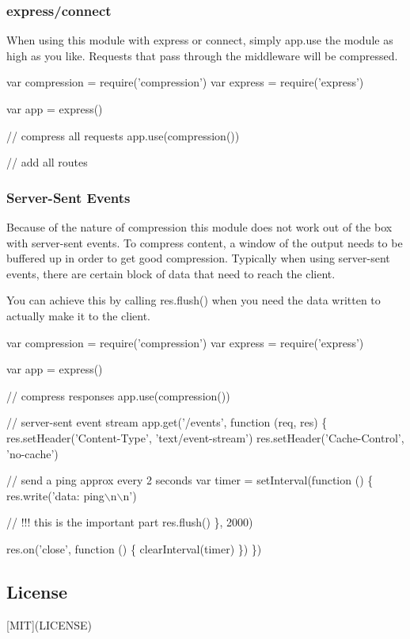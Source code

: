\subsubsection*{express/connect}

When using this module with express or connect, simply {\ttfamily app.\+use} the module as high as you like. Requests that pass through the middleware will be compressed.


\begin{DoxyCode}
var compression = require('compression')
var express = require('express')

var app = express()

// compress all requests
app.use(compression())

// add all routes
\end{DoxyCode}


\subsubsection*{Server-\/\+Sent Events}

Because of the nature of compression this module does not work out of the box with server-\/sent events. To compress content, a window of the output needs to be buffered up in order to get good compression. Typically when using server-\/sent events, there are certain block of data that need to reach the client.

You can achieve this by calling {\ttfamily res.\+flush()} when you need the data written to actually make it to the client.


\begin{DoxyCode}
var compression = require('compression')
var express     = require('express')

var app = express()

// compress responses
app.use(compression())

// server-sent event stream
app.get('/events', function (req, res) \{
  res.setHeader('Content-Type', 'text/event-stream')
  res.setHeader('Cache-Control', 'no-cache')

  // send a ping approx every 2 seconds
  var timer = setInterval(function () \{
    res.write('data: ping\(\backslash\)n\(\backslash\)n')

    // !!! this is the important part
    res.flush()
  \}, 2000)

  res.on('close', function () \{
    clearInterval(timer)
  \})
\})
\end{DoxyCode}


\subsection*{License}

\mbox{[}M\+IT\mbox{]}(L\+I\+C\+E\+N\+SE) 